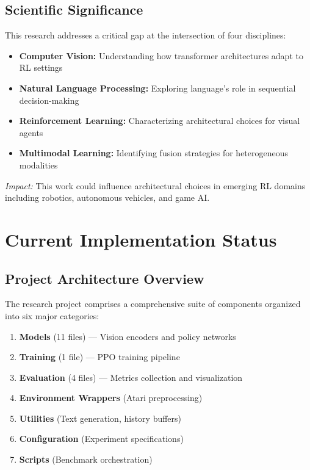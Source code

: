 \documentclass[12pt,a4paper,openany]{report}
\begin{document}
\section{Scientific Significance}

This research addresses a critical gap at the intersection of four disciplines:

\begin{itemize}
    \item \textbf{Computer Vision:} Understanding how transformer architectures adapt to RL settings
    \item \textbf{Natural Language Processing:} Exploring language's role in sequential decision-making
    \item \textbf{Reinforcement Learning:} Characterizing architectural choices for visual agents
    \item \textbf{Multimodal Learning:} Identifying fusion strategies for heterogeneous modalities
\end{itemize}

\textit{Impact:} This work could influence architectural choices in emerging RL domains including robotics, autonomous vehicles, and game AI.

\chapter{Current Implementation Status}

\section{Project Architecture Overview}

The research project comprises a comprehensive suite of components organized into six major categories:

\begin{enumerate}
    \item \textbf{Models} (11 files) --- Vision encoders and policy networks
    \item \textbf{Training} (1 file) --- PPO training pipeline
    \item \textbf{Evaluation} (4 files) --- Metrics collection and visualization
    \item \textbf{Environment Wrappers} (Atari preprocessing)
    \item \textbf{Utilities} (Text generation, history buffers)
    \item \textbf{Configuration} (Experiment specifications)
    \item \textbf{Scripts} (Benchmark orchestration)
\end{enumerate}
\end{document}
